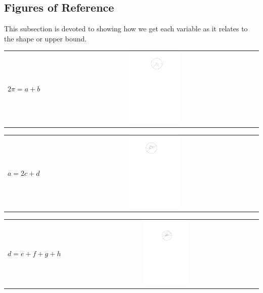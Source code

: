 \documentclass[11pt]{article}
\begin{document}
\subsection{Figures of Reference}
\begin{flushleft}
    This subsection is devoted to showing how we get each variable as it relates to the shape or upper bound.
\end{flushleft}
\begin{center}
    \begin{tabularx}{\textwidth}{lXc}
        \hline
        \multirow{2}{*}{$2\pi = a+b$} & & \parbox[c]{0.25\textwidth}{\includegraphics[width=0.25\textwidth]{Q2S1_Eq/eq_1.pdf}} \\
    \end{tabularx}
    \begin{tabularx}{\textwidth}{lXc}
        \hline
        \multirow{2}{*}{$a = 2c+d$} & & \parbox[c]{0.25\textwidth}{\includegraphics[width=0.25\textwidth]{Q2S1_Eq/eq_2.pdf}} \\
    \end{tabularx}
    \begin{tabularx}{\textwidth}{lXc}
        \hline
        \multirow{2}{*}{$d = e+f+g+h$} & & \parbox[c]{0.25\textwidth}{\includegraphics[width=0.25\textwidth]{Q2S1_Eq/eq_3.pdf}} \\

\end{tabularx}
\end{center}
\end{document}
